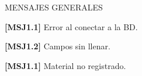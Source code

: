 MENSAJES GENERALES
	\begin{Citemize}
	\item {\bf [MSJ1.1]} Error al conectar a la BD.
	\item {\bf [MSJ1.2]} Campos sin llenar.
	\item {\bf [MSJ1.1]} Material no registrado.
	\end{Citemize}
